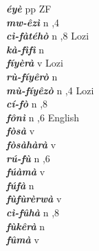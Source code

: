 \begin{multicols}{2}
{{\bfseries\itshape éyè}} \relax  pp  \relax   \relax  {} \relax  ZF \relax  \\
{{\bfseries\itshape mw-êzì}} \relax  n  ,4  \relax   \relax  \\
{{\bfseries\itshape cì-fàtéhò}} \relax  n  ,8  \relax  Lozi \relax  \\
{{\bfseries\itshape kà-fìfì}} \relax  n   \relax  {} \relax   \relax  \\
{{\bfseries\itshape fíyèrà}} \relax  v  \relax   \relax  {} \relax  Lozi \relax  \\
{{\bfseries\itshape rù-fíyêrò}} \relax  n   \relax  {} \relax   \relax  \\
{{\bfseries\itshape mù-fíyêzò}} \relax  n  ,4  \relax  Lozi \relax  \\
{{\bfseries\itshape cí-fò}} \relax  n  ,8  \relax   \relax  \\
{{\bfseries\itshape fônì}} \relax  n  ,6  \relax  English \relax  \\
{{\bfseries\itshape fòsà}} \relax  v  \relax   \relax  {} \relax   \relax  \\
{{\bfseries\itshape fòsàhàrà}} \relax  v  \relax   \relax  {} \relax   \relax  \\
{{\bfseries\itshape rú-fù}} \relax  n  ,6  \relax   \relax  \\
{{\bfseries\itshape fúàmà}} \relax  v  \relax  {} \relax   \relax  \\
{{\bfseries\itshape fúfà}} \relax  n   \relax  {} \relax   \relax  \\
{{\bfseries\itshape fùfùrèrwà}} \relax  v  \relax   \relax  {} \relax   \relax  \\
{{\bfseries\itshape cì-fûhà}} \relax  n  ,8  \relax   \relax  \\
{{\bfseries\itshape fùkêrà}} \relax  n   \relax  {} \relax   \relax  \\
{{\bfseries\itshape fûmà}} \relax  v  \relax   \relax  {} \relax   \relax  \\

\end{multicols}
